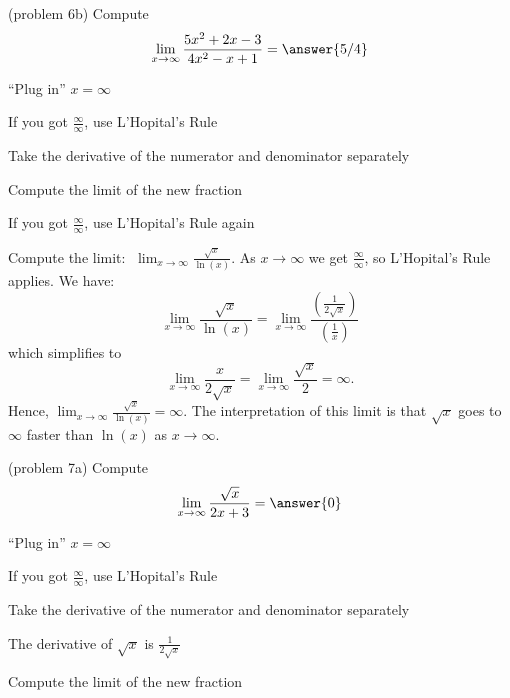 \documentclass{ximera}
\begin{document}
\begin{problem}(problem 6b)
  Compute
  \[
  \lim_{x \to \infty} \frac{5x^2 + 2x - 3}{4x^2 - x + 1} = \answer{5/4}
  \]
  
    \begin{hint}
      ``Plug in'' $x=\infty$
    \end{hint}
    \begin{hint}
      If you got $\frac{\infty}{\infty}$, use L'Hopital's Rule
    \end{hint}
    \begin{hint}
      Take the derivative of the numerator and denominator separately
    \end{hint}
		\begin{hint}
      Compute the limit of the new fraction
    \end{hint}
		\begin{hint}
		  If you got $\frac{\infty}{\infty}$, use L'Hopital's Rule again
	  \end{hint}
		
\end{problem}


\begin{example}[example 7]
Compute the limit:  $\displaystyle{\;\lim_{x \to \infty} \frac{\sqrt{x}}{\ln(x)}}$.
As $x \to \infty$ we get $\frac{\infty}{\infty}$, so L'Hopital's Rule applies.
We have:
\[\lim_{x \to \infty} \frac{\sqrt x}{\ln(x)} = 
\lim_{x \to \infty}\frac{\left(\frac{1}{2\sqrt x}\right)}{\left(\frac{1}{x}\right)}\]
which simplifies to 
\[\lim_{x\to\infty} \frac{x}{2\sqrt x} = \lim_{x\to\infty}\frac{\sqrt x}{2} = \infty.\]
Hence, $\lim_{x\to\infty} \frac{\sqrt x}{\ln(x)} = \infty$.
The interpretation of this limit is that $\sqrt x$ goes to $\infty$ faster than $\ln(x)$ as $x\to\infty$.
\end{example}

\begin{problem}(problem 7a)
  Compute
  \[
  \lim_{x \to \infty} \frac{\sqrt x}{2x + 3} = \answer{0}
  \]
  
    \begin{hint}
      ``Plug in'' $x=\infty$
    \end{hint}
    \begin{hint}
      If you got $\frac{\infty}{\infty}$, use L'Hopital's Rule
    \end{hint}
    \begin{hint}
      Take the derivative of the numerator and denominator separately
    \end{hint}
		\begin{hint}
		  The derivative of $\sqrt x$ is $\frac{1}{2\sqrt x}$
	  \end{hint}
		\begin{hint}
      Compute the limit of the new fraction
    \end{hint}
	
\end{problem}
\end{document}

